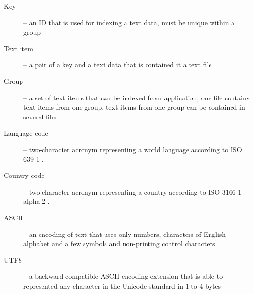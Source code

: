 \begin{description}
  \item[Key] -- an ID that is used for indexing a text data, must be unique within a group
  \item[Text item] -- a pair of a key and a text data that is contained it a text file
  \item[Group] -- a set of text items that can be indexed from application, one file contains text items from one group, text items from one group can be contained in several files
  \item[Language code] -- two-character acronym representing a world language according to ISO 639-1 \cite{ISO-639-1}.
  \item[Country code] -- two-character acronym representing a country according to ISO 3166-1 alpha-2 \cite{ISO-3166-1}.
  \item[ASCII] -- an encoding of text that uses only numbers, characters of English alphabet and a few symbols and non-printing control characters
  \item[UTF8] -- a backward compatible ASCII encoding extension that is able to represented any character in the Unicode standard in 1 to 4 bytes
\end{description}